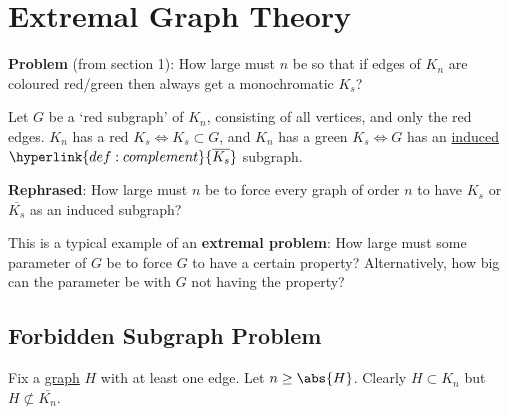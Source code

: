 \documentclass{article}
\newcommand{\red}[1]{\textcolor{bred}{#1}}
\newcommand{\green}[1]{\textcolor{bgreen}{#1}}
\begin{document}

\clearpage
\section{Extremal Graph Theory}

\textbf{Problem} (from section 1): How large must $n$ be so that if edges of \hyperlink{def:Kn}{$K_n$} are coloured \red{red}/\green{green} then always get a monochromatic $K_s$?

Let $G$ be a `\red{red} subgraph' of $K_n$, consisting of all vertices, and only the \red{red} edges.
$K_n$ has a \red{red} $K_s \iff K_s \subset G$, and $K_n$ has a \green{green} $K_s \iff G$ has an \hyperlink{def:indSubgraph}{induced} $\hyperlink{def:complement}{\overline{K_s}}$ subgraph.

\textbf{Rephrased}:
How large must $n$ be to force every graph of order $n$ to have $K_s$ or $\overline{K_s}$ as an induced subgraph?

This is a typical example of an \textbf{extremal problem}: How large must some parameter of $G$ be to force $G$ to have a certain property?
Alternatively, how big can the parameter be with $G$ not having the property?

\subsection{Forbidden Subgraph Problem}
Fix a \hyperlink{def:graph}{graph} $H$ with at least one edge. Let $n \geq \abs{H}$. Clearly $H \subset K_n$ but $H \not\subset \overline{K_n}$.
\end{document}
